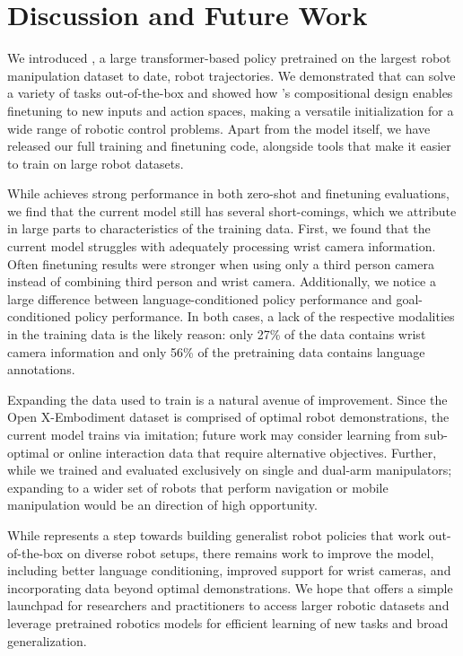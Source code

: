 
\section{Discussion and Future Work}
\label{sec:discussion}


We introduced \method{}, a large transformer-based policy pretrained
on the largest robot manipulation dataset to date,  \ntrajs{} robot trajectories. We demonstrated that \method{} can solve a variety of tasks out-of-the-box and showed how \method's compositional design enables finetuning to new inputs and action spaces, making \method{} a versatile initialization for a wide range of robotic control problems. Apart from the model itself, we have released our full training and finetuning code, alongside tools that make it easier to train on large robot datasets.

While \method{} achieves strong performance in both zero-shot and finetuning evaluations, we find that the current model still has several short-comings, which we attribute in large parts to characteristics of the training data.
First, we found that the current \method{} model struggles with adequately processing wrist camera information. Often finetuning results were stronger when using only a third person camera instead of combining third person and wrist camera. Additionally, we notice a large difference between language-conditioned policy performance and goal-conditioned policy performance. In both cases, a lack of the respective modalities in the training data is the likely reason: only 27\% of the data contains wrist camera information and only 56\% of the pretraining data contains language annotations.

Expanding the data used to train \method{} is a natural avenue of improvement. Since the Open X-Embodiment dataset is comprised of optimal robot demonstrations, the current model trains via imitation; future work may consider learning from sub-optimal or online interaction data that require alternative objectives. Further, while we trained and evaluated \method{} exclusively on single and dual-arm manipulators; expanding to a wider set of robots that perform navigation or mobile manipulation would be an direction of high opportunity. 

While \method{} represents a step towards building generalist robot policies that work out-of-the-box on diverse robot setups, there remains work to improve the model, including better language conditioning, improved support for wrist cameras, and incorporating data beyond optimal demonstrations. We hope that \method{} offers a simple launchpad for researchers and practitioners to access larger robotic datasets and leverage pretrained robotics models for efficient learning of new tasks and broad generalization.

